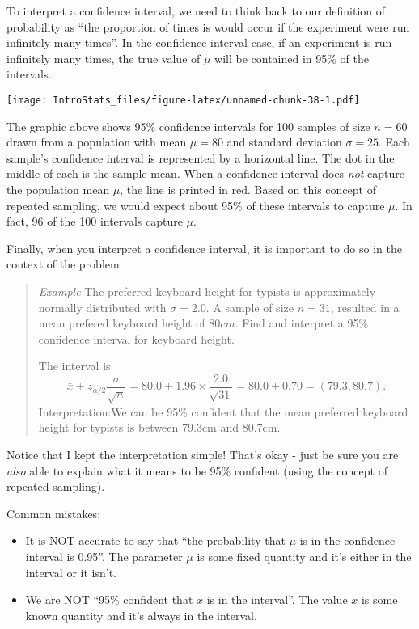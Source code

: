 \documentclass[
]{book}
\providecommand{\tightlist}{%
  \setlength{\itemsep}{0pt}\setlength{\parskip}{0pt}}
\begin{document}
To interpret a confidence interval, we need to think back to our definition of probability as ``the proportion of times is would occur if the experiment were run infinitely many times''. In the confidence interval case, if an experiment is run infinitely many times, the true value of \(\mu\) will be contained in 95\% of the intervals.

\texttt{[image: IntroStats\_files/figure-latex/unnamed-chunk-38-1.pdf]}

The graphic above shows 95\% confidence intervals for 100 samples of size \(n=60\) drawn from a population with mean \(\mu=80\) and standard deviation \(\sigma=25\). Each sample's confidence interval is represented by a horizontal line. The dot in the middle of each is the sample mean. When a confidence interval does \emph{not} capture the population mean \(\mu\), the line is printed in red. Based on this concept of repeated sampling, we would expect about 95\% of these intervals to capture \(\mu\). In fact, 96 of the 100 intervals capture \(\mu\).

Finally, when you interpret a confidence interval, it is important to do so in the context of the problem.

\begin{quote}
\emph{Example} The preferred keyboard height for typists is approximately normally distributed with \(\sigma=2.0\). A sample of size \(n=31\), resulted in a mean prefered keyboard height of \(80 cm\). Find and interpret a 95\% confidence interval for keyboard height.

The interval is \[\bar{x} \pm z_{\alpha/2}\frac{\sigma}{\sqrt{n}} = 80.0 \pm 1.96\times\frac{2.0}{\sqrt{31}} = 80.0 \pm 0.70 = (79.3, 80.7).\] Interpretation:We can be 95\% confident that the mean preferred keyboard height for typists is between 79.3cm and 80.7cm.
\end{quote}

Notice that I kept the interpretation simple! That's okay - just be sure you are \emph{also} able to explain what it means to be 95\% confident (using the concept of repeated sampling).

Common mistakes:

\begin{itemize}
\tightlist
\item
  It is NOT accurate to say that ``the probability that \(\mu\) is in the confidence interval is 0.95''. The parameter \(\mu\) is some fixed quantity and it's either in the interval or it isn't.
\item
  We are NOT ``95\% confident that \(\bar{x}\) is in the interval''. The value \(\bar{x}\) is some known quantity and it's always in the interval.
\end{itemize}
\end{document}

